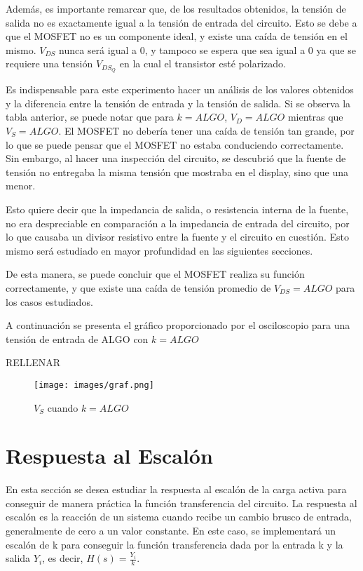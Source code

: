 \documentclass[12pt,oneside,a4paper]{article}
\begin{document}
Además, es importante remarcar que, de los resultados obtenidos, la tensión de salida no es exactamente 
igual a la tensión de entrada del circuito. Esto se debe a que el MOSFET no es un componente ideal, y
existe una caída de tensión en el mismo. $V_{DS}$ nunca será igual a 0, y tampoco se espera que sea 
igual a 0 ya que se requiere una tensión $V_{DS_Q}$ en la cual el transistor esté polarizado.

Es indispensable para este experimento hacer un análisis de los valores obtenidos y la diferencia entre 
la tensión de entrada y la tensión de salida. Si se observa la tabla anterior, se puede notar que para 
$k = ALGO$, $V_D = ALGO$ mientras que $V_S = ALGO$. El MOSFET no debería tener una caída de tensión 
tan grande, por lo que se puede pensar que el MOSFET no estaba conduciendo correctamente. Sin embargo, 
al hacer una inspección del circuito, se descubrió que la fuente de tensión no entregaba la misma 
tensión que mostraba en el display, sino que una menor. 

Esto quiere decir que la impedancia de salida, 
o resistencia interna de la fuente, no era despreciable en comparación a la impedancia de 
entrada del circuito, por lo que causaba un divisor resistivo entre la fuente y el circuito en 
cuestión. Esto mismo será estudiado en mayor profundidad en las siguientes secciones.

De esta manera, se puede concluir que el MOSFET realiza su función correctamente, y que existe una 
caída de tensión promedio de $V_{DS} = ALGO$ para los casos estudiados.

A continuación se presenta el gráfico proporcionado por el osciloscopio para una tensión de 
entrada de ALGO con $k = ALGO$

RELLENAR
\begin{figure}[H]
    \centering
    \texttt{[image: images/graf.png]}
    \caption{$V_S$ cuando $k = ALGO$}
\end{figure}


\newpage

\section{Respuesta al Escalón}

En esta sección se desea estudiar la respuesta al escalón de la carga activa para conseguir de 
manera práctica la función transferencia del circuito. La respuesta al escalón 
es la reacción de un sistema cuando recibe un cambio brusco de entrada, generalmente de cero a un valor 
constante. En este caso, se implementará un escalón de k para conseguir la función transferencia dada 
por la entrada k y la salida $Y_i$, es decir, $H(s) = \frac{Y_i}{k}$.
\end{document}
